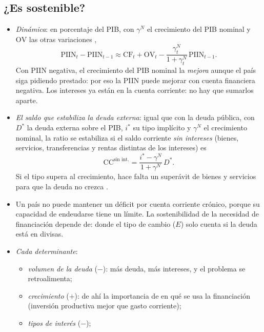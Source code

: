 \documentclass[11pt]{article}
\begin{document}
\subsection{¿Es sostenible?}\label{sec:sostenibilidad-exterior}

\begin{itemize}
\item \emph{Dinámica}: en porcentaje del PIB, con $\gamma^N$ el crecimiento del PIB nominal y $\mathrm{OV}$ las otras variaciones ,
\begin{equation}\label{eq:dinamica-piin}
\mathrm{PIIN}_t-\mathrm{PIIN}_{t-1}\approx\mathrm{CF}_t+\mathrm{OV}_t-\frac{\gamma^N_t}{1+\gamma^N_t}\,\mathrm{PIIN}_{t-1} .
\end{equation}
Con PIIN negativa, el crecimiento del PIB nominal la \emph{mejora} aunque el país siga pidiendo prestado: por eso la PIIN puede mejorar con cuenta financiera negativa. Los intereses ya están en la cuenta corriente: no hay que sumarlos aparte.
\item \emph{El saldo que estabiliza la deuda externa}: igual que con la deuda pública, con $D^*$ la deuda externa sobre el PIB, $i^*$ su tipo implícito y $\gamma^N$ el crecimiento nominal, la ratio se estabiliza si el saldo corriente \emph{sin intereses} (bienes, servicios, transferencias y rentas distintas de los intereses) es
\[
\mathrm{CC}^{\text{sin int.}}=\frac{i^*-\gamma^N}{1+\gamma^N}\,D^* .
\]
  Si el tipo supera al crecimiento, hace falta un superávit de bienes y servicios para que la deuda no crezca \parencite{FMI2013CaseStudy}.
\item Un país no puede mantener un déficit por cuenta corriente crónico, porque su capacidad de endeudarse tiene un límite. La sostenibilidad de la necesidad de financiación depende de:
donde el tipo de cambio ($E$) solo cuenta si la deuda está en divisas.
\item \emph{Cada determinante}:
  \begin{itemize}
  \item \emph{volumen de la deuda} ($-$): más deuda, más intereses, y el problema se retroalimenta;
  \item \emph{crecimiento} ($+$): de ahí la importancia de en qué se usa la financiación (inversión productiva mejor que gasto corriente);
  \item \emph{tipos de interés} ($-$);

\end{itemize}
\end{itemize}
\end{document}
